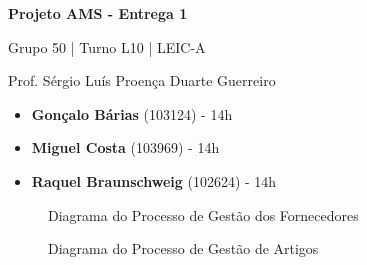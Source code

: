 \documentclass[12pt,a4paper]{article}
\begin{document}
\begin{titlepage}
  \begin{center}
    \vspace*{5cm}
    \Huge
    \textbf{Projeto AMS - Entrega 1}

    \vspace{0.5cm}
    \LARGE
    Grupo 50 | Turno L10 | LEIC-A

    \vspace{0.5cm}
    \large
    Prof. Sérgio Luís Proença Duarte Guerreiro

    \vfill
    \large
    \begin{minipage}{0.8\textwidth}
      \begin{itemize}
        \item[] \textbf{Gonçalo Bárias} (103124) - 14h
        \item[] \textbf{Miguel Costa} (103969) - 14h
        \item[] \textbf{Raquel Braunschweig} (102624) - 14h
      \end{itemize}
    \end{minipage}
  \end{center}
\end{titlepage}

%     
%
%     

\begin{landscape}
  \begin{figure}
    \centering
    
    \caption{Diagrama do Processo de Gestão dos Fornecedores}
    \label{fig:p1}
  \end{figure}
\end{landscape}

\begin{landscape}
  \begin{figure}
    \centering
    
    \caption{Diagrama do Processo de Gestão de Artigos}
    \label{fig:p2}
  \end{figure}
\end{landscape}
\end{document}
